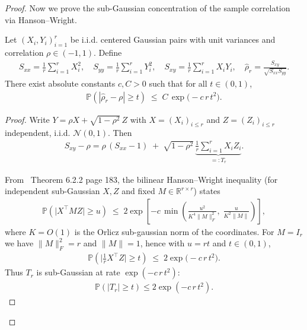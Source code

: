 \begin{proof}
Now we prove the sub-Gaussian concentration of the sample correlation via Hanson--Wright.
\begin{lemma}
    Let $(X_i,Y_i)_{i=1}^r$ be i.i.d. centered Gaussian pairs with unit variances and correlation $\rho\in(-1,1)$.
    Define
\begin{align}
    S_{xx}=\frac{1}{r}\sum_{i=1}^r X_i^2,\quad
    S_{yy}=\frac{1}{r}\sum_{i=1}^r Y_i^2,\quad
    S_{xy}=\frac{1}{r}\sum_{i=1}^r X_iY_i,\quad
    \hat{\rho}_r=\frac{S_{xy}}{\sqrt{S_{xx}S_{yy}}}.
\end{align}
    There exist absolute constants $c, C > 0$ such that for all $t\in(0,1)$,
\begin{align}
    \mathbb{P}\!\left(|\hat{\rho}_r-\rho|\ge t\right)
    \;\le\;
    C\,\exp\!\big(-c\,r\,t^2\big).
\end{align}
    \end{lemma}
    
    \begin{proof}
    
    Write $Y=\rho X+\sqrt{1-\rho^2}\,Z$ with $X=(X_i)_{i\le r}$ and $Z=(Z_i)_{i\le r}$ independent, i.i.d. $\mathcal N(0,1)$.
    Then
\begin{align}
    S_{xy}-\rho
    = \rho\,(S_{xx}-1)\;+\;\sqrt{1-\rho^2}\,\underbrace{\frac{1}{r}\sum_{i=1}^r X_iZ_i}_{=:T_r}.
\end{align}
    
    
    From~\cite{vershynin2018highdimensionalprobability} Theorem 6.2.2 page 183, the bilinear Hanson--Wright inequality (for independent sub-Gaussian $X,Z$ and fixed $M\in\mathbb{R}^{r\times r}$) states
\begin{align}
    \mathbb{P}\!\left(\big|X^\top M Z\big| \ge u\right)
    \;\le\; 2\exp\!\left[-c\,\min\!\left(\frac{u^2}{K^4\|M\|_F^2},\;\frac{u}{K^2\|M\|}\right)\right],
\end{align}
    where $K=O(1)$ is the Orlicz sub-gaussian norm of the coordinates. For $M=I_r$ we have $\|M\|_F^2=r$ and $\|M\|=1$, hence with $u=r t$ and $t\in(0,1)$,
\begin{align}
    \mathbb{P}\!\left(\Big|\frac{1}{r}X^\top Z\Big|\ge t\right)
    \;\le\;2\exp\!\big(-c\,r\,t^2\big).
\end{align}
    Thus $T_r$ is sub-Gaussian at rate $\exp(-c\,r\,t^2)$:
\begin{align}
    \mathbb{P}\!\left(|T_r|\ge t\right)\le 2\exp(-c\,r\,t^2).
\end{align}
    

\end{proof}
\end{proof}
